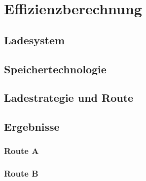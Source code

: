 \chapter{Effizienzberechnung} %
\section{Ladesystem}
\section{Speichertechnologie}
\section{Ladestrategie und Route}
\section{Ergebnisse}
\subsection{Route A}
\subsection{Route B}